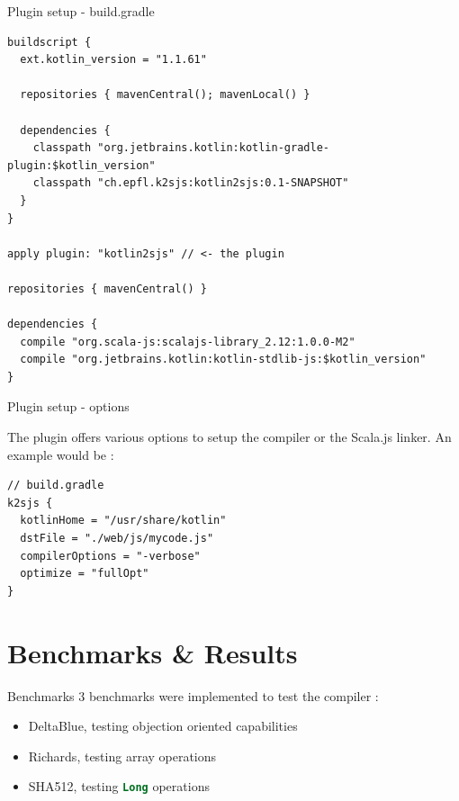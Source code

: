 \documentclass[10pt]{beamer}
\newcommand{\inlinecode}[2]{\colorbox{minted-bg}{\lstinline[language=#1]$#2$}}
\newcommand{\ktinline}[1]{\inlinecode{kotlin}{#1}}
\begin{document}
\begin{frame}[fragile]{Plugin setup - build.gradle}
\begin{verbatim}
buildscript {
  ext.kotlin_version = "1.1.61"
    
  repositories { mavenCentral(); mavenLocal() }

  dependencies {
    classpath "org.jetbrains.kotlin:kotlin-gradle-plugin:$kotlin_version"
    classpath "ch.epfl.k2sjs:kotlin2sjs:0.1-SNAPSHOT"
  }
}

apply plugin: "kotlin2sjs" // <- the plugin

repositories { mavenCentral() }

dependencies {  
  compile "org.scala-js:scalajs-library_2.12:1.0.0-M2"
  compile "org.jetbrains.kotlin:kotlin-stdlib-js:$kotlin_version"
}
\end{verbatim}
\end{frame}

\begin{frame}[fragile]{Plugin setup - options}

The plugin offers various options to setup the compiler or the Scala.js linker. An example would be :

 \begin{verbatim}
// build.gradle
k2sjs {
  kotlinHome = "/usr/share/kotlin"
  dstFile = "./web/js/mycode.js"
  compilerOptions = "-verbose"
  optimize = "fullOpt"
}
 \end{verbatim}

\end{frame}



\section{Benchmarks \& Results}


\begin{frame}{Benchmarks}
  3 benchmarks were implemented to test the compiler :

 \begin{itemize}
  \item DeltaBlue, testing objection oriented capabilities
  \item Richards, testing array operations
  \item SHA512, testing \ktinline{Long} operations
 \end{itemize}

\end{frame}
\end{document}
